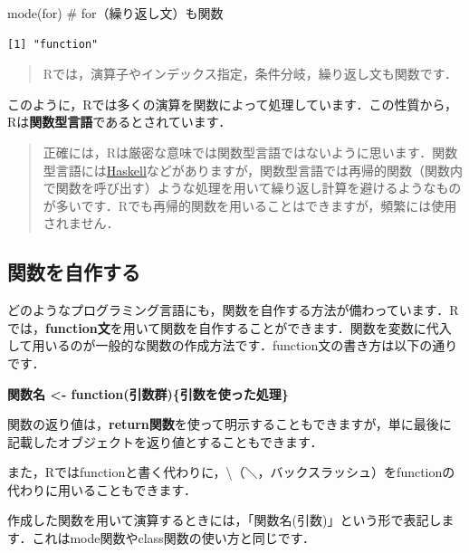 \documentclass[
  letterpaper,
  DIV=11,
  numbers=noendperiod]{scrreprt}
\newenvironment{Shaded}{\begin{snugshade}}{\end{snugshade}}
\newcommand{\AttributeTok}[1]{\textcolor[rgb]{0.40,0.45,0.13}{#1}}
\newcommand{\CommentTok}[1]{\textcolor[rgb]{0.37,0.37,0.37}{#1}}
\newcommand{\FunctionTok}[1]{\textcolor[rgb]{0.28,0.35,0.67}{#1}}
\newcommand{\NormalTok}[1]{\textcolor[rgb]{0.00,0.23,0.31}{#1}}
\newcommand{\StringTok}[1]{\textcolor[rgb]{0.13,0.47,0.30}{#1}}
\begin{document}
\begin{Shaded}
\begin{Highlighting}[]
\FunctionTok{mode}\NormalTok{(}\StringTok{\textasciigrave{}}\AttributeTok{for}\StringTok{\textasciigrave{}}\NormalTok{) }\CommentTok{\# for（繰り返し文）も関数}
\end{Highlighting}
\end{Shaded}

\begin{verbatim}
[1] "function"
\end{verbatim}

\begin{quote}
Rでは，演算子やインデックス指定，条件分岐，繰り返し文も関数です．
\end{quote}

このように，Rでは多くの演算を関数によって処理しています．この性質から，Rは\textbf{関数型言語}であるとされています．

\begin{quote}
正確には，Rは厳密な意味では関数型言語ではないように思います．関数型言語には\href{https://www.haskell.org/}{Haskell}などがありますが，関数型言語では再帰的関数（関数内で関数を呼び出す）ような処理を用いて繰り返し計算を避けるようなものが多いです．Rでも再帰的関数を用いることはできますが，頻繁には使用されません．
\end{quote}

\hypertarget{ux95a2ux6570ux3092ux81eaux4f5cux3059ux308b}{%
\subsection{関数を自作する}\label{ux95a2ux6570ux3092ux81eaux4f5cux3059ux308b}}

どのようなプログラミング言語にも，関数を自作する方法が備わっています．Rでは，\textbf{function文}を用いて関数を自作することができます．関数を変数に代入して用いるのが一般的な関数の作成方法です．function文の書き方は以下の通りです．

\textbf{関数名 \textless- function(引数群)\{引数を使った処理\}}

関数の返り値は，\textbf{return関数}を使って明示することもできますが，単に最後に記載したオブジェクトを返り値とすることもできます．

また，Rではfunctionと書く代わりに，\textbackslash（＼，バックスラッシュ）をfunctionの代わりに用いることもできます．

作成した関数を用いて演算するときには，「関数名(引数)」という形で表記します．これはmode関数やclass関数の使い方と同じです．
\end{document}
